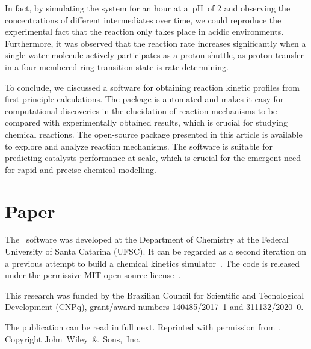 In fact,
by simulating the system for an hour at a~pH~of 2
and observing the concentrations of different intermediates over time,
we could reproduce the experimental fact that
the reaction only takes place in acidic environments.
Furthermore,
it was observed that the reaction rate increases significantly when
a single water molecule actively participates as a proton shuttle,
as proton transfer in a four-membered ring transition state is rate-determining.

To conclude,
we discussed a software for obtaining reaction kinetic profiles from first-principle calculations.
The package is automated and makes it easy for computational discoveries in the elucidation of reaction mechanisms
to be compared with experimentally obtained results,
which is crucial for studying chemical reactions.
The open-source package presented in this article is available to explore and analyze reaction mechanisms.
The software is suitable for predicting catalysts performance at scale,
which is crucial for the emergent need for rapid and precise chemical modelling.

\section{Paper}

The \overreact{}~software was developed at the Department of Chemistry at the Federal University of Santa Catarina (UFSC).
It can be regarded as a second iteration on a previous attempt to build a chemical kinetics simulator~\cite{pyrrole2019zenodo}.
The code is released under the permissive MIT open-source license~\cite{MITLicense}.

This research was funded by the Brazilian Council for Scientific and Tecnological Development (CNPq),
grant/award numbers 140485/2017--1 and 311132/2020--0.

The publication can be read in full next.
Reprinted with permission from
.
Copyright
\citeyear{Schneider_2022}
John~Wiley~\&~Sons,~Inc.


